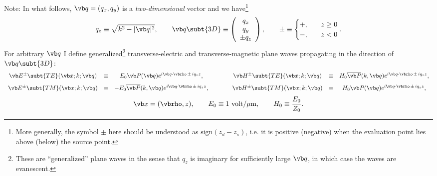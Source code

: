 \documentclass[letterpaper]{article}
\begin{document}
Note: In what follows,
$\vb q=(q_x,q_y)$ is a \textit{two-dimensional} vector and we
have\footnote{More generally, the symbol $\pm$ here should be understood
as $\text{sign}(z_d - z_s)$, i.e. it is positive (negative) when the evaluation 
point lies above (below) the source point.}
$$ q_z \equiv \sqrt{k^2 - |\vb q|^2}, 
   \qquad
   \vb q\subt{3D}\equiv
   \left(\begin{array}{c}q_x \\ q_y \\ \pm q_z \end{array}\right), 
   \qquad
   \pm \equiv
   \begin{cases}
     +, \quad & z\ge 0 \\ 
     -, \quad & z<   0
   \end{cases}.
$$
For arbitrary $\vb q$ I define generalized\footnote{These 
are ``generalized'' plane waves in the sense that $q_z$ is 
imaginary for sufficiently large $\vb q$, in which case the 
waves are evanescent.} transverse-electric and
transverse-magnetic plane waves propagating in the direction
of $\vb q\subt{3D}$:
$$\begin{array}{ccccccc}
 \vb E^{\pm} \subt{TE}(\vb x; k; \vb q)
   &\equiv& E_0 \vb P(\vb q) e^{i\vb q \cdot \vbrho \, \pm \, iq_z z},
   &\qquad&
 \vb H^{\pm} \subt{TE}(\vb x; k; \vb q)
   &\equiv& H_0 \overline{\vb P}(k, \vb q) e^{i\vb q \cdot \vbrho \, \pm \, iq_z z},
\\[8pt]
 \vb E^{\pm} \subt{TM}(\vb x; k; \vb q)
   &\equiv& -E_0 \overline{\vb P}(k,\vb q) e^{i\vb q \cdot \vbrho \, \pm \, iq_z z},
   &\qquad&
 \vb H^{\pm} \subt{TM}(\vb x; k; \vb q)
   &\equiv& H_0 \vb P(\vb q) e^{i\vb q \cdot \vbrho \, \pm \, iq_z z},
\end{array}$$
$$ \vb x=(\vbrho, z),
   \qquad
   E_0 \equiv 1 \text{ volt/$\mu$m}, \qquad H_0\equiv \frac{E_0}{Z_0}.
$$
\end{document}
